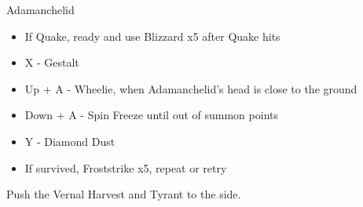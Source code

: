 \begin{multicols}{2}
\begin{battle}{Adamanchelid}
\begin{itemize}
\begin{itemize}
        \item If Quake, ready and use Blizzard x5 after Quake hits
        \item X - Gestalt
        \item Up + A - Wheelie, when Adamanchelid's head is close to the ground
        \item Down + A - Spin Freeze until out of summon points
        \item Y - Diamond Dust
        \item If survived, Froststrike x5, repeat or retry
    \end{itemize}
\end{itemize}
\end{battle}
\columnbreak
{}
Push the Vernal Harvest and Tyrant to the side.


\end{multicols}
